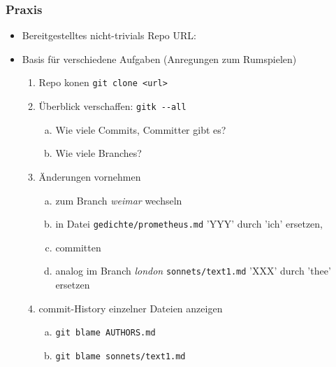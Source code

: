 \documentclass{beamer}
\begin{document}
\begin{frame}[fragile,label=uebung10]
\frametitle{Praxis}
\begin{itemize}
 \item Bereitgestelltes nicht-trivials Repo URL:
 \item Basis für verschiedene Aufgaben (Anregungen zum Rumspielen)
\begin{enumerate}
 \item Repo konen \texttt{git clone <url>}
 \item Überblick verschaffen: \verb|gitk --all|
 \begin{enumerate}[a)]
  \item Wie viele Commits, Committer gibt es?
  \item Wie viele Branches?
 \end{enumerate}
 \item Änderungen vornehmen
 \begin{enumerate}[a)]
 \item zum Branch \textit{weimar} wechseln
 \item in Datei \verb|gedichte/prometheus.md| 'YYY' durch 'ich' ersetzen,
 \item committen
 \item analog im Branch \textit{london} \verb|sonnets/text1.md| 'XXX' durch 'thee' ersetzen
 \end{enumerate}
 \item commit-History einzelner Dateien anzeigen
 \begin{enumerate}[a)]
  \item \verb|git blame AUTHORS.md|
  \item \verb|git blame sonnets/text1.md|
 \end{enumerate}
\setcounter{taskcounter}{\value{enumi}}
\end{enumerate}

\end{itemize}

\end{frame}


\end{document}
